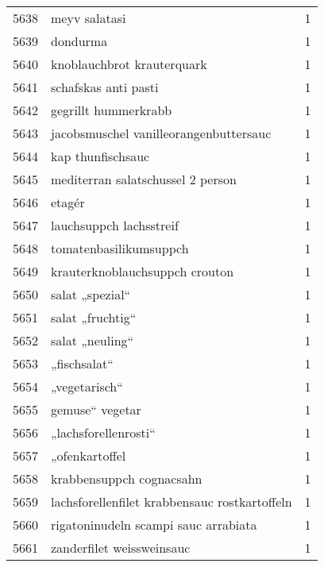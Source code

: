 \begin{tabular}{llr}
5638 &                                      meyv salatasi &      1 \\
5639 &                                           dondurma &      1 \\
5640 &                         knoblauchbrot krauterquark &      1 \\
5641 &                               schafskas anti pasti &      1 \\
5642 &                               gegrillt hummerkrabb &      1 \\
5643 &             jacobsmuschel vanilleorangenbuttersauc &      1 \\
5644 &                                  kap thunfischsauc &      1 \\
5645 &                  mediterran salatschussel 2 person &      1 \\
5646 &                                             etagér &      1 \\
5647 &                            lauchsuppch lachsstreif &      1 \\
5648 &                             tomatenbasilikumsuppch &      1 \\
5649 &                     krauterknoblauchsuppch crouton &      1 \\
5650 &                                    salat „spezial“ &      1 \\
5651 &                                   salat „fruchtig“ &      1 \\
5652 &                                    salat „neuling“ &      1 \\
5653 &                                       „fischsalat“ &      1 \\
5654 &                                      „vegetarisch“ &      1 \\
5655 &                                    gemuse“ vegetar &      1 \\
5656 &                               „lachsforellenrosti“ &      1 \\
5657 &                                     „ofenkartoffel &      1 \\
5658 &                           krabbensuppch cognacsahn &      1 \\
5659 &      lachsforellenfilet krabbensauc rostkartoffeln &      1 \\
5660 &               rigatoninudeln scampi sauc arrabiata &      1 \\
5661 &                          zanderfilet weissweinsauc &      1 \\

\end{tabular}
